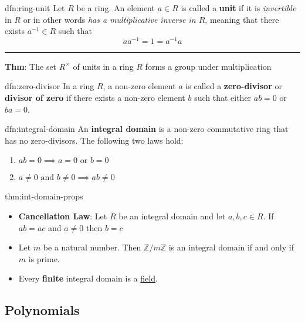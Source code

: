 \documentclass[landscape, 8pt]{extarticle}
\begin{document}
\begin{multicols}{3}
\begin{dfn}{dfn:ring-unit}{}
    Let $R$ be a ring. An element $a\in R$ is called a \textbf{unit} if it is \textit{invertible} in $R$ or in other words \textit{has a multiplicative inverse in $R$}, meaning that there exists $a^{-1}\in R$ such that
    \[aa^{-1} = 1 = a^{-1} a\]

    \vspace{-5pt}
    \noindent\rule{\textwidth}{0.2pt}
    \textbf{Thm}: The set $R^{\times}$ of units in a ring $R$ forms a group under multiplication
\end{dfn}

\begin{dfn}{dfn:zero-divisor}{}
    In a ring $R$, a non-zero element $a$ is called a \textbf{zero-divisor} or \textbf{divisor of zero} if there exists a non-zero element $b$ such that either $ab = 0$ or $ba = 0$.
\end{dfn}

\begin{dfn}{dfn:integral-domain}{}
    An \textbf{integral domain} is a non-zero commutative ring that has no zero-divisors. The following two laws hold:
    \begin{enumerate}
        \setlength\itemsep{0em}
        \item $ab = 0 \implies a = 0 \text{ or } b = 0$
        \item $a \ne 0 \text{ and } b \ne 0 \implies ab \ne 0$
    \end{enumerate}
\end{dfn}


\begin{thm}{thm:int-domain-props}{}
    \begin{itemize}[leftmargin=*]
        \setlength\itemsep{0em}
        \item \textbf{Cancellation Law}: Let $R$ be an integral domain and let $a,b,c\in R$. If $ab = ac$ and $a\ne 0$ then $b = c$
        \item Let $m$ be a natural number. Then $\mathbb{Z} / m\mathbb{Z}$ is an integral domain if and only if $m$ is prime.
        \item Every \textbf{finite} integral domain is a \hyperref[dfn:field]{field}.
    \end{itemize}
    
    
\end{thm}

\subsection{Polynomials}


\end{multicols}
\end{document}
